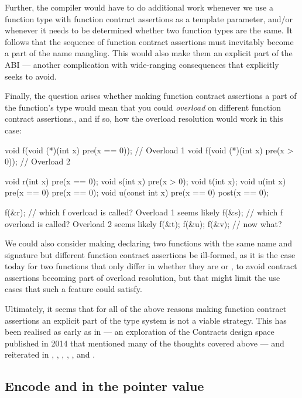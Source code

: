 Further, the compiler would have to do additional work whenever we use a function type with function contract assertions as a template parameter, and/or whenever it needs to be determined whether two function types are the same. It follows that the sequence of function contract assertions must inevitably become a part of the name mangling. This would also make them an explicit part of the ABI --- another complication with wide-ranging consequences that \cite{P2900R7} explicitly seeks to avoid.

Finally, the question arises whether making function contract assertions a part of the function's type would mean that you could \emph{overload} on different function contract assertions., and if so, how the overload resolution would work in this case:
\begin{codeblock}
void f(void (*)(int x) pre(x == 0));  // Overload 1
void f(void (*)(int x) pre(x > 0));   // Overload 2

void r(int x) pre(x == 0);
void s(int x) pre(x > 0);
void t(int x);
void u(int x) pre(x == 0) pre(x == 0);
void u(const int x) pre(x == 0) post(x == 0);

f(&r);  // which f overload is called? Overload 1 seems likely
f(&s);  // which f overload is called? Overload 2 seems likely
f(&t);  f(&u);  f(&v); // now what?
\end{codeblock}
We could also consider making declaring two functions with the same name and signature but different function contract assertions be ill-formed, as it is the case today for two functions that only differ in whether they are  or , to avoid contract assertions becoming part of overload resolution, but that might limit the use cases that such a feature could satisfy.

Ultimately, it seems that for all of the above reasons making function contract assertions an explicit part of the type system is not a viable strategy. This has been realised as early as in \cite{N4110} --- an exploration of the Contracts design space published in 2014 that mentioned many of the thoughts covered above --- and reiterated in \cite{N4415}, \cite{P0246R0}, \cite{P0247R0}, \cite{P0287R0}, \cite{P0380R1}, and \cite{P0542R5}.

\subsection{Encode  and  in the pointer value}
\label{subsec:makevalue}

